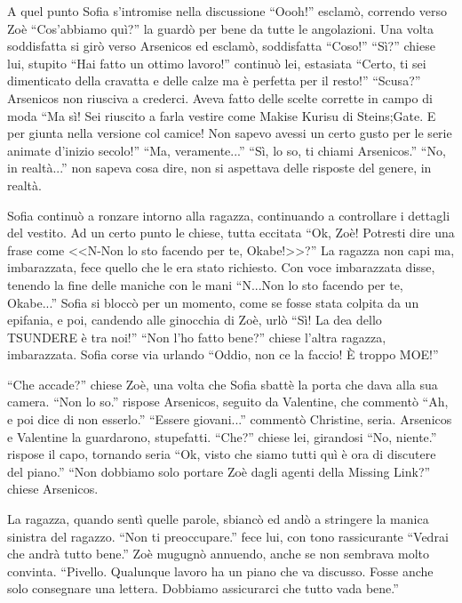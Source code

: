     A quel punto Sofia s'intromise nella discussione ``Oooh!'' esclamò, correndo verso Zoè ``Cos'abbiamo quì?'' la
    guardò per bene da tutte le angolazioni. Una volta soddisfatta si girò verso Arsenicos ed esclamò, soddisfatta
    ``Coso!'' ``Sì?'' chiese lui, stupito ``Hai fatto un ottimo lavoro!'' continuò lei, estasiata ``Certo, ti sei
    dimenticato della cravatta e delle calze ma è perfetta per il resto!'' ``Scusa?'' Arsenicos non riusciva a crederci.
    Aveva fatto delle scelte corrette in campo di moda ``Ma sì! Sei riuscito a farla vestire come Makise Kurisu di
    Steins;Gate. E per giunta nella versione col camice! Non sapevo avessi un certo gusto per le serie animate d'inizio secolo!'' ``Ma, veramente...'' ``Sì,
    lo so, ti chiami Arsenicos.'' ``No, in realtà...'' non sapeva cosa dire, non si aspettava delle risposte del genere,
    in realtà.

    Sofia continuò a ronzare intorno alla ragazza, continuando a controllare i dettagli del vestito. Ad un certo punto
    le chiese, tutta eccitata ``Ok, Zoè! Potresti dire una frase come <<N-Non lo sto facendo per te, Okabe!>>?'' La
    ragazza non capi ma, imbarazzata, fece quello che le era stato richiesto. Con voce imbarazzata disse, tenendo la
    fine delle maniche con le mani ``N...Non lo sto facendo per te, Okabe...'' Sofia si bloccò per un momento, come se
    fosse stata colpita da un epifania, e poi, candendo alle ginocchia di Zoè, urlò ``Sì! La dea dello TSUNDERE è tra
    noi!'' ``Non l'ho fatto bene?'' chiese l'altra ragazza, imbarazzata. Sofia corse via urlando ``Oddio, non ce la
    faccio! È troppo MOE!''

    ``Che accade?'' chiese Zoè, una volta che Sofia sbattè la porta che dava alla sua camera. ``Non lo so.'' rispose
    Arsenicos, seguito da Valentine, che commentò ``Ah, e poi dice di non esserlo.'' ``Essere giovani...'' commentò
    Christine, seria. Arsenicos e Valentine la guardarono, stupefatti. ``Che?'' chiese lei, girandosi ``No, niente.''
    rispose il capo, tornando seria ``Ok, visto che siamo tutti quì è ora di discutere del piano.'' ``Non dobbiamo solo
    portare Zoè dagli agenti della Missing Link?'' chiese Arsenicos.

    La ragazza, quando sentì quelle parole, sbiancò ed andò a stringere la manica sinistra del ragazzo. ``Non ti
    preoccupare.'' fece lui, con tono rassicurante ``Vedrai che andrà tutto bene.'' Zoè mugugnò annuendo, anche se non
    sembrava molto convinta. ``Pivello. Qualunque lavoro ha un piano che va discusso. Fosse anche solo consegnare una
    lettera. Dobbiamo assicurarci che tutto vada bene.''

